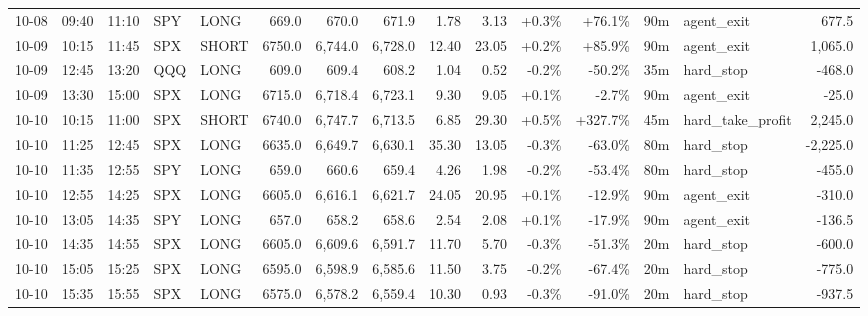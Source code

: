 \documentclass[11pt,a4paper,twoside]{article}
\begin{document}
\begin{landscape}
\begin{center}
\begin{longtable}{>{\color{txtmain}}l l l l l r r r r r r r r >{\color{txtmain}}l r}
10-08 & 09:40 & 11:10 & SPY & LONG & 669.0 & 670.0 & 671.9 & 1.78 & 3.13 & \textcolor{wingreen}{+0.3\%} & \textcolor{wingreen}{+76.1\%} & 90m & agent\_exit & \textcolor{wingreen}{677.5} \\
10-09 & 10:15 & 11:45 & SPX & SHORT & 6750.0 & 6,744.0 & 6,728.0 & 12.40 & 23.05 & \textcolor{wingreen}{+0.2\%} & \textcolor{wingreen}{+85.9\%} & 90m & agent\_exit & \textcolor{wingreen}{1,065.0} \\
10-09 & 12:45 & 13:20 & QQQ & LONG & 609.0 & 609.4 & 608.2 & 1.04 & 0.52 & \textcolor{lossred}{-0.2\%} & \textcolor{lossred}{-50.2\%} & 35m & hard\_stop & \textcolor{lossred}{-468.0} \\
10-09 & 13:30 & 15:00 & SPX & LONG & 6715.0 & 6,718.4 & 6,723.1 & 9.30 & 9.05 & \textcolor{wingreen}{+0.1\%} & \textcolor{lossred}{-2.7\%} & 90m & agent\_exit & \textcolor{lossred}{-25.0} \\
10-10 & 10:15 & 11:00 & SPX & SHORT & 6740.0 & 6,747.7 & 6,713.5 & 6.85 & 29.30 & \textcolor{wingreen}{+0.5\%} & \textcolor{wingreen}{+327.7\%} & 45m & hard\_take\_profit & \textcolor{wingreen}{2,245.0} \\
10-10 & 11:25 & 12:45 & SPX & LONG & 6635.0 & 6,649.7 & 6,630.1 & 35.30 & 13.05 & \textcolor{lossred}{-0.3\%} & \textcolor{lossred}{-63.0\%} & 80m & hard\_stop & \textcolor{lossred}{-2,225.0} \\
10-10 & 11:35 & 12:55 & SPY & LONG & 659.0 & 660.6 & 659.4 & 4.26 & 1.98 & \textcolor{lossred}{-0.2\%} & \textcolor{lossred}{-53.4\%} & 80m & hard\_stop & \textcolor{lossred}{-455.0} \\
10-10 & 12:55 & 14:25 & SPX & LONG & 6605.0 & 6,616.1 & 6,621.7 & 24.05 & 20.95 & \textcolor{wingreen}{+0.1\%} & \textcolor{lossred}{-12.9\%} & 90m & agent\_exit & \textcolor{lossred}{-310.0} \\
10-10 & 13:05 & 14:35 & SPY & LONG & 657.0 & 658.2 & 658.6 & 2.54 & 2.08 & \textcolor{wingreen}{+0.1\%} & \textcolor{lossred}{-17.9\%} & 90m & agent\_exit & \textcolor{lossred}{-136.5} \\
10-10 & 14:35 & 14:55 & SPX & LONG & 6605.0 & 6,609.6 & 6,591.7 & 11.70 & 5.70 & \textcolor{lossred}{-0.3\%} & \textcolor{lossred}{-51.3\%} & 20m & hard\_stop & \textcolor{lossred}{-600.0} \\
10-10 & 15:05 & 15:25 & SPX & LONG & 6595.0 & 6,598.9 & 6,585.6 & 11.50 & 3.75 & \textcolor{lossred}{-0.2\%} & \textcolor{lossred}{-67.4\%} & 20m & hard\_stop & \textcolor{lossred}{-775.0} \\
10-10 & 15:35 & 15:55 & SPX & LONG & 6575.0 & 6,578.2 & 6,559.4 & 10.30 & 0.93 & \textcolor{lossred}{-0.3\%} & \textcolor{lossred}{-91.0\%} & 20m & hard\_stop & \textcolor{lossred}{-937.5} \\

\end{longtable}
\end{center}
\end{landscape}
\end{document}
